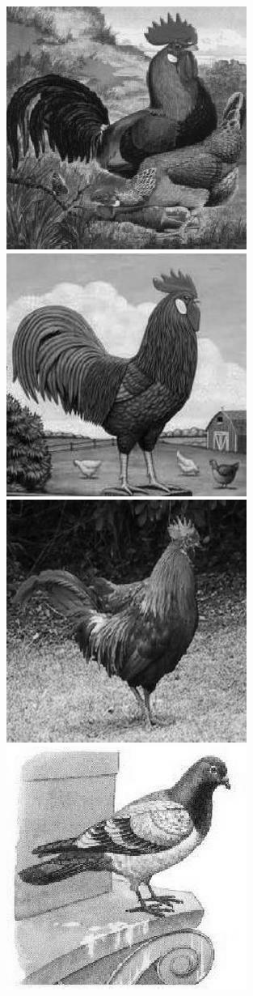 \begin{figure}
  \centering
      \includegraphics[scale=.2]{roosterrs-image_0001.jpg}
      \includegraphics[scale=.2]{roosterrs-image_0002.jpg}
      \includegraphics[scale=.2]{roosterrs-image_0003.jpg}
      \includegraphics[scale=.2]{pigeonrs-image_0001.jpg}

\end{figure}
